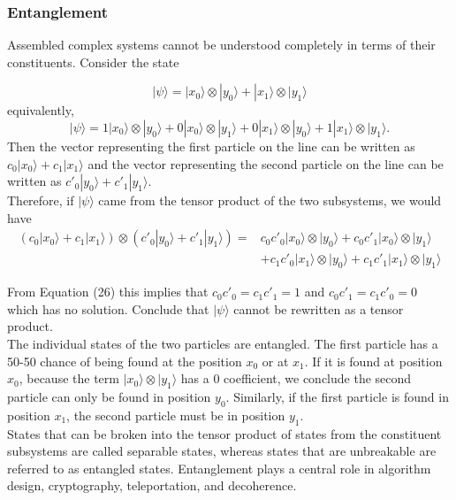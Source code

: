 \documentclass{article}
\begin{document}
\subsubsection*{Entanglement}
Assembled complex systems cannot be understood completely in terms of their constituents. Consider the state

\begin{equation*}
    |\psi\rangle = |x_0\rangle \otimes |y_0\rangle + |x_1\rangle \otimes |y_1\rangle
\end{equation*}
equivalently,
\begin{equation}
    |\psi\rangle = 1|x_0\rangle \otimes |y_0\rangle + 0|x_0\rangle \otimes |y_1\rangle + 0|x_1\rangle \otimes |y_0\rangle + 1|x_1\rangle \otimes |y_1\rangle.
\end{equation}
Then the vector representing the first particle on the line can be written as
$c_0|x_0\rangle + c_1|x_1\rangle$ and the vector representing the second particle on the line can be written as $c'_0|y_0\rangle + c'_1|y_1\rangle$.\\

Therefore, if $|\psi\rangle$ came from the tensor product of the two subsystems, we would have
\begin{equation}
\begin{aligned}
   (c_0|x_0\rangle + c_1|x_1\rangle) \otimes (c'_0|y_0\rangle + c'_1|y_1\rangle) = &c_0c'_0|x_0\rangle \otimes |y_0\rangle + c_0c'_1|x_0\rangle \otimes |y_1\rangle\\
   &+ c_1c'_0|x_1\rangle \otimes |y_0\rangle + c_1c'_1|x_1\rangle \otimes |y_1\rangle
\end{aligned}
\end{equation}

From Equation (26) this implies that $c_0c'_0 = c_1c'_1 = 1$ and $c_0c'_1 = c_1c'_0 = 0$ which has no solution. Conclude that $|\psi\rangle$ cannot be rewritten as a tensor product.\\

The individual states of the two particles are entangled. The first particle has a 50-50 chance of being found at the position $x_0$ or at $x_1$. If it is found at position $x_0$, because the term $|x_0\rangle \otimes |y_1\rangle$ has a 0 coefficient, we conclude the second particle can only be found in position $y_0$. Similarly, if the first particle is found in position $x_1$, the second particle must be in position $y_1$.\\

States that can be broken into the tensor product of states from the constituent subsystems are called separable states, whereas states that are unbreakable are referred to as entangled states. Entanglement plays a central role in algorithm design, cryptography, teleportation, and decoherence.
\end{document}
